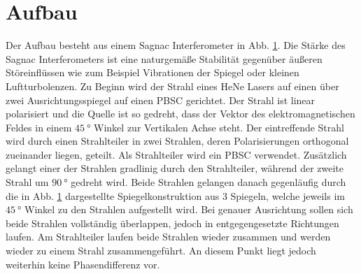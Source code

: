 \section{Aufbau}
Der Aufbau besteht aus einem Sagnac Interferometer in Abb. \ref{}. Die Stärke des Sagnac Interferometers ist eine naturgemäße Stabilität gegenüber äußeren Störeinflüssen wie zum Beispiel Vibrationen der Spiegel oder kleinen Luftturbolenzen. Zu Beginn wird der Strahl eines HeNe Lasers auf einen über zwei Ausrichtungsspiegel auf einen PBSC gerichtet. Der Strahl ist linear polarisiert und die Quelle ist so gedreht, dass der Vektor des elektromagnetischen Feldes in einem $\SI{45}{\degree}$ Winkel zur Vertikalen Achse steht. Der eintreffende Strahl wird durch einen Strahlteiler in zwei Strahlen, deren Polarisierungen orthogonal zueinander liegen, geteilt. Als Strahlteiler wird ein PBSC verwendet. Zusätzlich gelangt einer der Strahlen gradlinig durch den Strahlteiler, während der zweite Strahl um $\SI{90}{\degree}$ gedreht wird. Beide Strahlen gelangen danach gegenläufig durch die in Abb. \ref{} dargestellte Spiegelkonstruktion aus 3 Spiegeln, welche jeweils im $\SI{45}{\degree}$ Winkel zu den Strahlen aufgestellt wird. Bei genauer Ausrichtung sollen sich beide Strahlen vollständig überlappen, jedoch in entgegengesetzte Richtungen laufen. Am Strahlteiler laufen beide Strahlen wieder zusammen und werden wieder zu einem Strahl zusammengeführt. An diesem Punkt liegt jedoch weiterhin keine Phasendifferenz vor. 